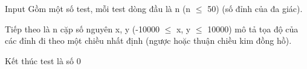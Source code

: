 Input
Gồm một số test, mỗi test dòng đầu là n (n  $\le$  50) (số đỉnh của đa giác).   


   Tiếp theo là n cặp số nguyên x, y (-10000  $\le$  x, y  $\le$  10000) mô tả tọa độ của các đỉnh đi theo một chiều nhất định (ngược hoặc thuận chiều kim đồng hồ).   


   Kết thúc test là số 0